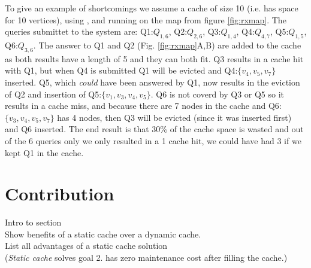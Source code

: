 To give an example of \lrus shortcomings we assume a cache of size 10 (i.e. has space for 10 vertices), using \lruns, and running on the map from figure \ref{fig:rxmap}. The queries submittet to the system are: 
Q1:$Q_{1,6}$, Q2:$Q_{2,6}$, Q3:$Q_{1,4}$, Q4:$Q_{4,7}$, Q5:$Q_{1,5}$, Q6:$Q_{3,6}$.
The answer to Q1 and Q2 (Fig. \ref{fig:rxmap}A,B) are added to the cache as both results have a length of 5 and they can both fit. Q3 results in a cache hit with Q1, but when Q4 is submitted Q1 will be evicted and Q4:$\{v_4,v_5,v_7\}$ inserted. Q5, which \textit{could} have been answered by Q1, now results in the eviction of Q2 and insertion of Q5:$\{v_1,v_3,v_4,v_5\}$. Q6 is not coverd by Q3 or Q5 so it results in a cache miss, and because there are 7 nodes in the cache and Q6:$\{v_3,v_4,v_5,v_7\}$ has 4 nodes, then Q3 will be evicted (since it was inserted first) and Q6 inserted. 
The end result is that 30\% of the cache space is wasted and out of the 6 queries only we only resulted in a 1 cache hit, we could have had 3 if we kept Q1 in the cache.












\section{Contribution} \label{sec:contribution}

Intro to section \\
Show benefits of a static cache over a dynamic cache.\\
List all advantages of a static cache solution \\
(\textit{Static cache} solves goal 2. has zero maintenance cost after filling the cache.)

